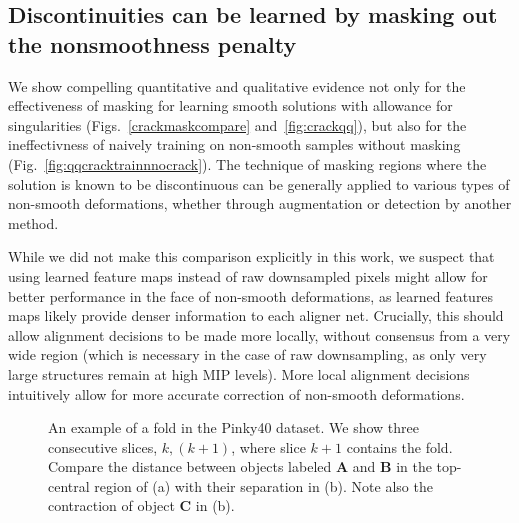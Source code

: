 \documentclass{article}
\begin{document}
\subsection{Discontinuities can be learned by masking out the nonsmoothness penalty}

We show compelling quantitative and qualitative evidence not only for the effectiveness of masking for learning smooth solutions with allowance for singularities (Figs.~\ref{crackmaskcompare} and~\ref{fig:crackqq}), but also for the ineffectivness of naively training on non-smooth samples without masking (Fig.~\ref{fig:qqcracktrainnnocrack}). The technique of masking regions where the solution is known to be discontinuous can be generally applied to various types of non-smooth deformations, whether through augmentation or detection by another method.

While we did not make this comparison explicitly in this work, we suspect that using learned feature maps instead of raw downsampled pixels might allow for better performance in the face of non-smooth deformations, as learned features maps likely provide denser information to each aligner net. Crucially, this should allow alignment decisions to be made more locally, without consensus from a very wide region (which is necessary in the case of raw downsampling, as only very large structures remain at high MIP levels). More local alignment decisions intuitively allow for more accurate correction of non-smooth deformations.

\begin{figure}[htp]
	\centering
	\caption[Example of a fold in the Pinky40 EM dataset]{An example of a fold in the Pinky40 dataset. We show three consecutive slices, $k,(k+1)$, where slice $k+1$ contains the fold. Compare the distance between objects labeled \textbf{A} and \textbf{B} in the top-central region of (a) with their separation in (b). Note also the contraction of object \textbf{C} in (b).}\label{folds}
\end{figure}
\end{document}
